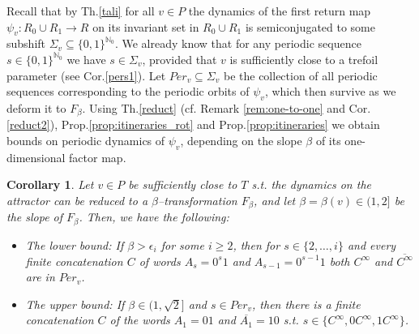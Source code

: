 \documentclass[10pt,reqno]{amsart}
\theoremstyle{plain}
\theoremstyle{assumption}
\theoremstyle{notation}
\theoremstyle{claim}
\theoremstyle{conj}
\theoremstyle{theorem}
\theoremstyle{proposition}
\theoremstyle{corollary}
\newtheorem{corollary}{Corollary}[section]
\begin{document}
Recall that by Th.\ref{tali} for all $v\in P$ the dynamics of the first return map $\psi_v:R_0\cup R_1\to R$ on its invariant set in $R_0\cup R_1$ is semiconjugated to some subshift $\Sigma_v\subseteq\{0,1\}^{\mathbb{N}_0}$. We already know that for any periodic sequence $s\in\{0,1\}^{\mathbb{N}_0}$ we have $s\in\Sigma_v$, provided that $v$ is sufficiently close to a trefoil parameter (see Cor.\ref{pers1}). Let $Per_v\subseteq \Sigma_v$ be the collection of all periodic sequences corresponding to the periodic orbits of $\psi_v$, which then survive as we deform it to $F_\beta$. Using Th.\ref{reduct} (cf. Remark \ref{rem:one-to-one} and Cor.\ref{reduct2}), Prop.\ref{prop:itineraries_rot} and Prop.\ref{prop:itineraries} we obtain bounds on periodic dynamics of $\psi_v$, depending on the slope $\beta$ of its one-dimensional factor map.
\begin{corollary}
    \label{symbolicper}
    Let $v\in P$ be sufficiently close to $T$ s.t. the dynamics on the attractor can be reduced to a $\beta$--transformation $F_{\beta}$, and let $\beta=\beta(v)\in(1,2]$ be the slope of $F_{\beta}$. Then, we have the following:
    \begin{itemize}
        \item The lower bound: If $\beta>\epsilon_i$ for some $i\geq2$, then for $s\in\{2,\ldots,i\}$ and every finite concatenation $C$ of words $A_s=0^s1$ and $A_{s-1}=0^{s-1}1$ both $C^\infty$ and $\overline{C^\infty}$ are in $Per_v$.
        \item The upper bound: If $\beta\in(1,\sqrt{2}]$ and $s\in Per_v$, then there is a finite concatenation $C$ of the words $A_1=01$ and $\overline{A_1}=10$ s.t. $s\in\{C^\infty,0C^\infty,1C^\infty\}$. 
    \end{itemize}
\end{corollary}
\end{document}
